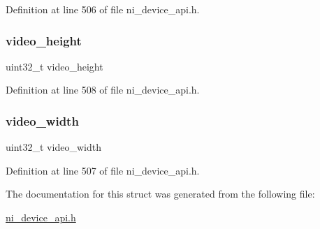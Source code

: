 Definition at line 506 of file ni\+\_\+device\+\_\+api.\+h.

\mbox{\label{struct__ni__packet_af65e7328fad30f40770959957538da7c}} 
\subsubsection{\texorpdfstring{video\_height}{video\_height}}
{\footnotesize\ttfamily uint32\+\_\+t video\+\_\+height}



Definition at line 508 of file ni\+\_\+device\+\_\+api.\+h.

\mbox{\label{struct__ni__packet_a94c61f9d8155afb285177936e9fa30ce}} 
\subsubsection{\texorpdfstring{video\_width}{video\_width}}
{\footnotesize\ttfamily uint32\+\_\+t video\+\_\+width}



Definition at line 507 of file ni\+\_\+device\+\_\+api.\+h.



The documentation for this struct was generated from the following file\+:\begin{DoxyCompactItemize}
\item 
\mbox{\hyperlink{ni__device__api_8h}{ni\+\_\+device\+\_\+api.\+h}}\end{DoxyCompactItemize}
